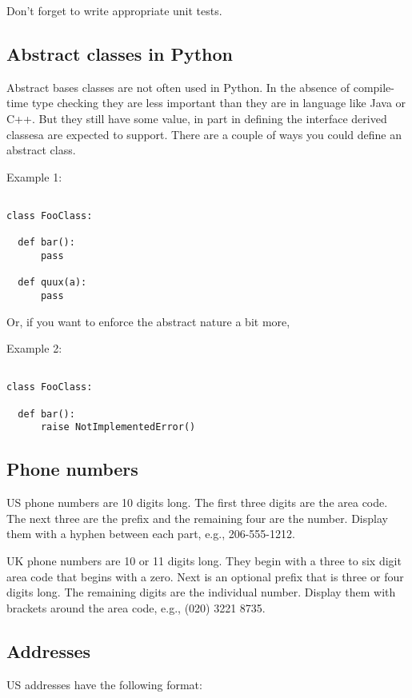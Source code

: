 \documentclass{article}
\begin{document}
Don't forget to write appropriate unit tests.

\subsection{Abstract classes in Python}

Abstract bases classes are not often used in Python.  In the absence
of compile-time type checking they are less important than they are in language
like Java or C++.  But they still have some value, in part in defining the
interface derived classesa are expected to support. There are a couple of ways 
you could define an abstract class.

Example 1:

\begin{verbatim}

class FooClass:

  def bar():
      pass

  def quux(a):
      pass
\end{verbatim}

\newpage
Or, if you want to enforce the abstract nature a bit more,

Example 2:

\begin{verbatim}

class FooClass:

  def bar():
      raise NotImplementedError()

\end{verbatim}

\subsection{Phone numbers}

US phone numbers are 10 digits long. The first three digits are the area code.
The next three are the prefix and the remaining four are the number.  Display them 
with a hyphen between each part, e.g., 206-555-1212.

UK phone numbers are 10 or 11 digits long.  They begin with a three to six
digit area code that begins with a zero.  Next is an optional prefix that is three or four digits long.
The remaining digits are the individual number. Display them with brackets around
the area code, e.g., (020) 3221 8735.

\subsection{Addresses}
US addresses have the following format:
\end{document}
